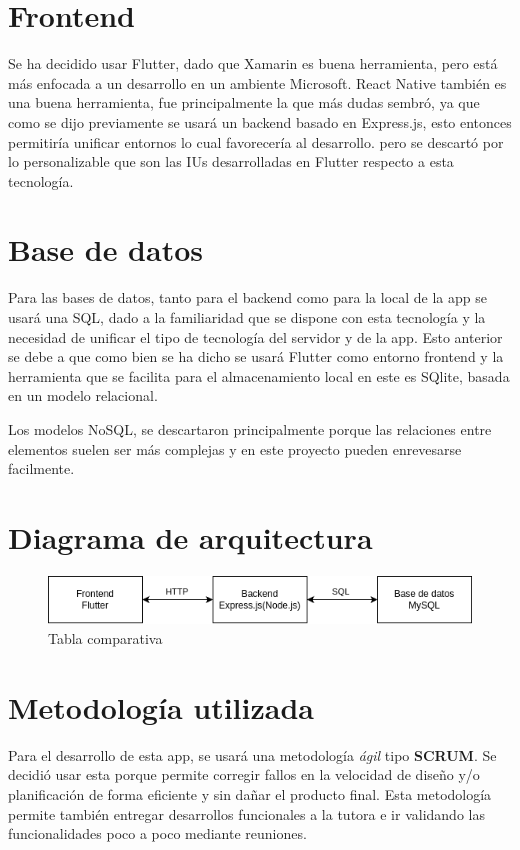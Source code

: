\section{Frontend}

Se ha decidido usar Flutter, dado que Xamarin es buena herramienta, pero está más enfocada a un desarrollo en un ambiente Microsoft.
React Native también es una buena herramienta, fue principalmente la que más dudas sembró, ya que como se dijo previamente se usará un backend basado en Express.js, esto entonces permitiría unificar entornos lo cual favorecería al desarrollo. pero se descartó por lo personalizable que son las IUs desarrolladas en Flutter respecto a esta tecnología.

\section{Base de datos}

Para las bases de datos, tanto para el backend como para la local de la app se usará una SQL, dado a la familiaridad que se dispone con esta tecnología y la necesidad de unificar el tipo de tecnología del servidor y de la app. Esto anterior se debe a que como bien se ha dicho se usará Flutter como entorno frontend y la herramienta que se facilita para el almacenamiento local en este es SQlite, basada en un modelo relacional.

Los modelos NoSQL, se descartaron principalmente porque las relaciones entre elementos suelen ser más complejas y en este proyecto pueden enrevesarse facilmente.

\section{Diagrama de arquitectura}

\begin{figure}[H]
   \centering
    \includegraphics[width=\textwidth]{tablas/Arq.png}
    \caption{Tabla comparativa}
    \label{fig:Tabla comparativa}
\end{figure} 

\section{Metodología utilizada}
Para el desarrollo de esta app, se usará una metodología \textit{ágil} tipo \textbf{SCRUM}. Se decidió usar esta porque permite corregir fallos en la velocidad de diseño y/o planificación de forma eficiente y sin dañar el producto final. Esta metodología permite también entregar desarrollos funcionales a la tutora e ir validando las funcionalidades poco a poco mediante reuniones.

